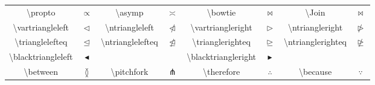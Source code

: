 \begin{tabular}{cc|cc|cc|cc}
    \textbackslash\textsf{propto} & $\propto$ & \textbackslash\textsf{asymp} & $\asymp$ & \textbackslash\textsf{bowtie} & $\bowtie$ & \textbackslash\textsf{Join} & $\Join$ \\ 
    \textbackslash\textsf{vartriangleleft}  & $\vartriangleleft$ & \textbackslash\textsf{ntriangleleft}  & $\ntriangleleft$ & \textbackslash\textsf{vartriangleright}  & $\vartriangleright$ & \textbackslash\textsf{ntriangleright} & $\ntriangleright$ \\ 
    \textbackslash\textsf{trianglelefteq}  & $\trianglelefteq$ & \textbackslash\textsf{ntrianglelefteq}  & $\ntrianglelefteq$ & \textbackslash\textsf{trianglerighteq}  & $\trianglerighteq$ & \textbackslash\textsf{ntrianglerighteq} & $\ntrianglerighteq$ \\ 
    \textbackslash\textsf{blacktriangleleft} & $\blacktriangleleft$ &  &  & \textbackslash\textsf{blacktriangleright} & $\blacktriangleright$ &  &  \\ 
    \textbackslash\textsf{between}  & $\between$ & \textbackslash\textsf{pitchfork} & $\pitchfork$ & \textbackslash\textsf{therefore} & $\therefore$ & \textbackslash\textsf{because} & $\because$ \\ \hline
\end{tabular}
